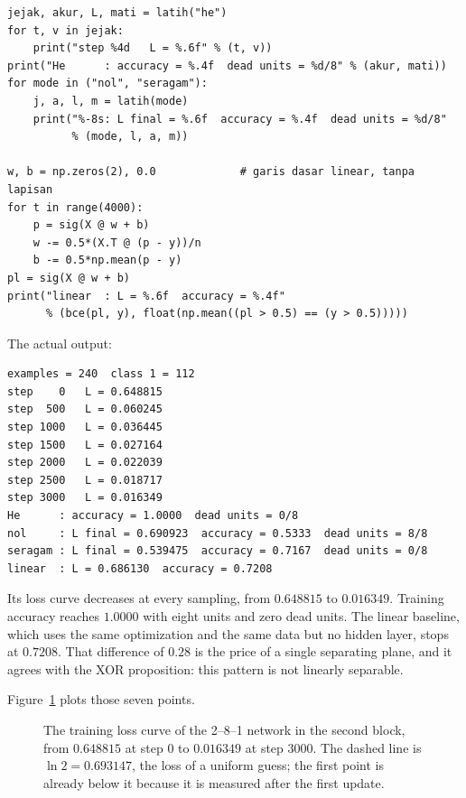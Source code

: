 \begin{lab}
\begin{verbatim}
jejak, akur, L, mati = latih("he")
for t, v in jejak:
    print("step %4d   L = %.6f" % (t, v))
print("He      : accuracy = %.4f  dead units = %d/8" % (akur, mati))
for mode in ("nol", "seragam"):
    j, a, l, m = latih(mode)
    print("%-8s: L final = %.6f  accuracy = %.4f  dead units = %d/8"
          % (mode, l, a, m))

w, b = np.zeros(2), 0.0             # garis dasar linear, tanpa lapisan
for t in range(4000):
    p = sig(X @ w + b)
    w -= 0.5*(X.T @ (p - y))/n
    b -= 0.5*np.mean(p - y)
pl = sig(X @ w + b)
print("linear  : L = %.6f  accuracy = %.4f"
      % (bce(pl, y), float(np.mean((pl > 0.5) == (y > 0.5)))))
\end{verbatim}
The actual output:
\begin{verbatim}
examples = 240  class 1 = 112
step    0   L = 0.648815
step  500   L = 0.060245
step 1000   L = 0.036445
step 1500   L = 0.027164
step 2000   L = 0.022039
step 2500   L = 0.018717
step 3000   L = 0.016349
He      : accuracy = 1.0000  dead units = 0/8
nol     : L final = 0.690923  accuracy = 0.5333  dead units = 8/8
seragam : L final = 0.539475  accuracy = 0.7167  dead units = 0/8
linear  : L = 0.686130  accuracy = 0.7208
\end{verbatim}
\end{lab}

Its loss curve decreases at every sampling, from $0.648815$ to $0.016349$. Training accuracy
reaches $1.0000$ with eight units and zero dead units. The linear baseline, which uses the same
optimization and the same data but no hidden layer, stops at $0.7208$. That difference of $0.28$
is the price of a single separating plane, and it agrees with the XOR proposition: this pattern
is not linearly separable.

Figure~\ref{fig:kurva-kerugian} plots those seven points.

\begin{figure}[htbp]
\centering
{}
\caption{The training loss curve of the 2--8--1 network in the second block, from $0.648815$ at
step $0$ to $0.016349$ at step $3000$. The dashed line is $\ln 2=0.693147$, the loss of a
uniform guess; the first point is already below it because it is measured after the first
update.}
\label{fig:kurva-kerugian}
\end{figure}


